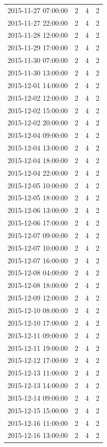\begin{tabular}{lrrr}
2015-11-27 07:00:00 & 2 & 4 & 2 \\
2015-11-27 22:00:00 & 2 & 4 & 2 \\
2015-11-28 12:00:00 & 2 & 4 & 2 \\
2015-11-29 17:00:00 & 2 & 4 & 2 \\
2015-11-30 07:00:00 & 2 & 4 & 2 \\
2015-11-30 13:00:00 & 2 & 4 & 2 \\
2015-12-01 14:00:00 & 2 & 4 & 2 \\
2015-12-02 12:00:00 & 2 & 4 & 2 \\
2015-12-02 15:00:00 & 2 & 4 & 2 \\
2015-12-02 20:00:00 & 2 & 4 & 2 \\
2015-12-04 09:00:00 & 2 & 4 & 2 \\
2015-12-04 13:00:00 & 2 & 4 & 2 \\
2015-12-04 18:00:00 & 2 & 4 & 2 \\
2015-12-04 22:00:00 & 2 & 4 & 2 \\
2015-12-05 10:00:00 & 2 & 4 & 2 \\
2015-12-05 18:00:00 & 2 & 4 & 2 \\
2015-12-06 13:00:00 & 2 & 4 & 2 \\
2015-12-06 17:00:00 & 2 & 4 & 2 \\
2015-12-07 09:00:00 & 2 & 4 & 2 \\
2015-12-07 10:00:00 & 2 & 4 & 2 \\
2015-12-07 16:00:00 & 2 & 4 & 2 \\
2015-12-08 04:00:00 & 2 & 4 & 2 \\
2015-12-08 18:00:00 & 2 & 4 & 2 \\
2015-12-09 12:00:00 & 2 & 4 & 2 \\
2015-12-10 08:00:00 & 2 & 4 & 2 \\
2015-12-10 17:00:00 & 2 & 4 & 2 \\
2015-12-11 09:00:00 & 2 & 4 & 2 \\
2015-12-11 19:00:00 & 2 & 4 & 2 \\
2015-12-12 17:00:00 & 2 & 4 & 2 \\
2015-12-13 11:00:00 & 2 & 4 & 2 \\
2015-12-13 14:00:00 & 2 & 4 & 2 \\
2015-12-14 09:00:00 & 2 & 4 & 2 \\
2015-12-15 15:00:00 & 2 & 4 & 2 \\
2015-12-16 11:00:00 & 2 & 4 & 2 \\
2015-12-16 13:00:00 & 2 & 4 & 2 \\

\end{tabular}
